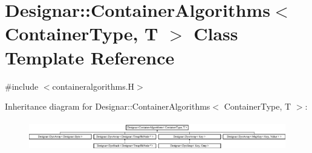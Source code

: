 \hypertarget{class_designar_1_1_container_algorithms}{}\section{Designar\+:\+:Container\+Algorithms$<$ Container\+Type, T $>$ Class Template Reference}
\label{class_designar_1_1_container_algorithms}


{\ttfamily \#include $<$containeralgorithms.\+H$>$}

Inheritance diagram for Designar\+:\+:Container\+Algorithms$<$ Container\+Type, T $>$\+:\begin{figure}[H]
\begin{center}
\leavevmode
\includegraphics[height=1.337580cm]{class_designar_1_1_container_algorithms}
\end{center}
\end{figure}
